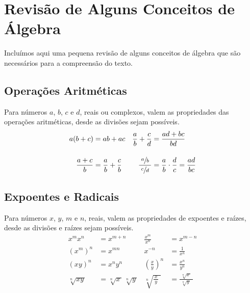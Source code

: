 \section{Revisão de Alguns Conceitos de Álgebra}
\label{sec:Revisao_Algebra}

Incluímos aqui uma pequena revisão de alguns conceitos de álgebra que
são necessários para a compreensão do texto.

\subsection*{Operações Aritméticas}

Para números $a$, $b$, $c$ e $d$, reais ou complexos,
valem as propriedades das operações aritméticas, desde as divisões sejam possíveis.
\begin{align*}
	a(b+c)                                 & = ab + ac                                        &
	\frac{a}{b} + \frac{c}{d}              & = \frac{ad + bc}{bd}                             \\[4mm]
	\frac{a+c}{b}                          & = \frac{a}{b} + \frac{c}{b}                      &
	\dfrac{\;\sfrac{a}{b}\;}{\sfrac{c}{d}} & = \frac{a}{b} \cdot \frac{d}{c} = \frac{ad}{bc}
\end{align*}

\subsection*{Expoentes e Radicais}

Para números $x$, $y$, $m$ e $n$, reais,
valem as propriedades de expoentes e raízes,
desde as divisões e raízes sejam possíveis.
\begin{align*}
	x^m x^n                     & = x^{m+n}                                 &
	\frac{x^m}{x^n}             & = x^{m-n}                                 \\[5mm]
	(x^m)^n                     & = x^{mn}                                  &
	x^{-n}                      & = \frac{1}{x^n}                           \\[5mm]
	(xy)^n                      & = x^n y^n                                 &
	\left(\frac{x}{y}\right)^n  & = \frac{x^n}{y^n}                         \\[5mm]
	\sqrt[n]{xy\,}              & = \sqrt[n]{x\,}\,\sqrt[n]{y\,}            &
	\sqrt[n]{\frac{\,x\,}{y}\;} & = \frac{\;\sqrt[n]{x\,}\;}{\sqrt[n]{y\,}}
\end{align*}

